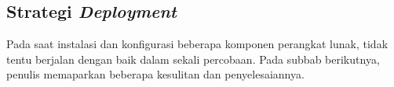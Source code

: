   \subsection{Strategi \textit{Deployment}}
	  Pada saat instalasi dan konfigurasi beberapa komponen perangkat lunak, tidak tentu berjalan dengan baik dalam sekali percobaan. Pada subbab berikutnya, penulis memaparkan beberapa kesulitan dan penyelesaiannya.
	  
	
%	
%	
%	
	
	
	
	
	
	
	
	 
  
  
  
  
  
  
